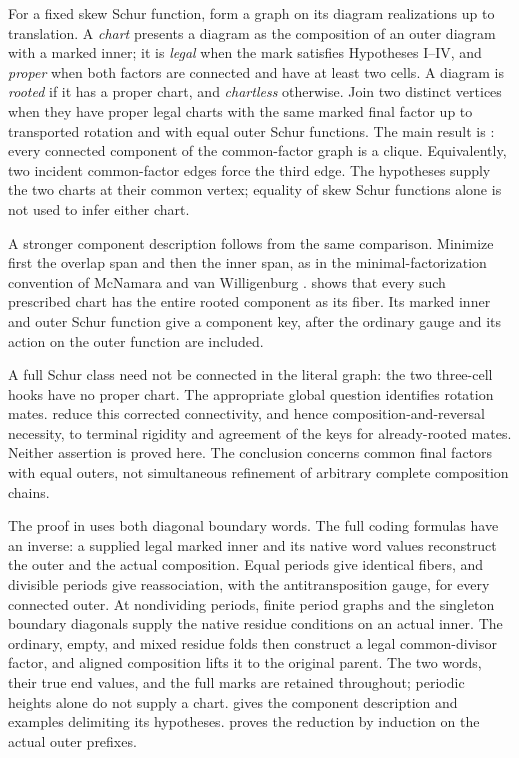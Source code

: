 \documentclass[11pt,a4paper]{amsart}
\numberwithin{equation}{section}
\theoremstyle{plain}
\theoremstyle{definition}
\begin{document}
For a fixed skew Schur function, form a graph on its diagram realizations up to translation.  A \emph{chart} presents a diagram as the composition of an outer diagram with a marked inner; it is \emph{legal} when the mark satisfies Hypotheses I--IV, and \emph{proper} when both factors are connected and have at least two cells.  A diagram is \emph{rooted} if it has a proper chart, and \emph{chartless} otherwise.  Join two distinct vertices when they have proper legal charts with the same marked final factor up to transported rotation and with equal outer Schur functions.  The main result is : every connected component of the common-factor graph is a clique.  Equivalently, two incident common-factor edges force the third edge.  The hypotheses supply the two charts at their common vertex; equality of skew Schur functions alone is not used to infer either chart.

A stronger component description follows from the same comparison.  Minimize first the overlap span and then the inner span, as in the minimal-factorization convention of McNamara and van Willigenburg \cite[Def.~5.5]{McNamara2009Classification}.   shows that every such prescribed chart has the entire rooted component as its fiber.  Its marked inner and outer Schur function give a component key, after the ordinary gauge and its action on the outer function are included.

A full Schur class need not be connected in the literal graph: the two three-cell hooks have no proper chart.  The appropriate global question identifies rotation mates.   reduce this corrected connectivity, and hence composition-and-reversal necessity, to terminal rigidity and agreement of the keys for already-rooted mates.  Neither assertion is proved here.  The conclusion concerns common final factors with equal outers, not simultaneous refinement of arbitrary complete composition chains.

The proof in  uses both diagonal boundary words.  The full coding formulas have an inverse: a supplied legal marked inner and its native word values reconstruct the outer and the actual composition.  Equal periods give identical fibers, and divisible periods give reassociation, with the antitransposition gauge, for every connected outer.  At nondividing periods, finite period graphs and the singleton boundary diagonals supply the native residue conditions on an actual inner.  The ordinary, empty, and mixed residue folds then construct a legal common-divisor factor, and aligned composition lifts it to the original parent.  The two words, their true end values, and the full marks are retained throughout; periodic heights alone do not supply a chart.   gives the component description and examples delimiting its hypotheses.   proves the reduction by induction on the actual outer prefixes.
\end{document}

